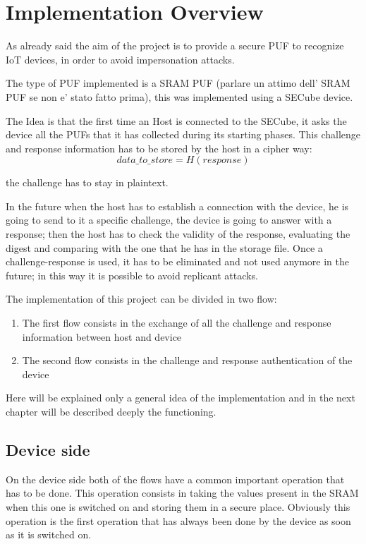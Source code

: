 \chapter{Implementation Overview}
As already said the aim of the project is to provide a secure PUF to recognize IoT devices, in order to avoid impersonation attacks.

The type of PUF implemented is a SRAM PUF (parlare un attimo dell' SRAM PUF se non e' stato fatto prima), this was implemented using a SECube device.

The Idea is that the first time an Host is connected to the SECube, it asks the device all the PUFs that it has collected during its starting phases.
This challenge and response information has to be stored by the host in a cipher way:
\begin{equation}\label{eq:eq1}
 data\_to\_store=H(response)
 \end{equation}
 
  the challenge has to stay in plaintext.

In the future when the host has to establish a connection with the device, he is going to send to it a specific challenge, the device is going to answer with a response;
then the host has to check the validity of the response, evaluating the digest and comparing with the one that he has in the storage file.
Once a challenge-response is used, it has to be eliminated and not used anymore in the future; in this way it is possible to avoid replicant attacks.


The implementation of this project can be divided in two flow:
\begin{enumerate}
	\item The first flow consists in the exchange of all the challenge and response information between host and device
	\item The second flow consists in the challenge and response authentication of the device
\end{enumerate}

Here will be explained only a general idea of the implementation and in the next chapter will be described deeply the functioning.

\section {Device side} 
On the device side both of the flows have a common important operation that has to be done. This operation consists in taking the values present in the SRAM when this one is switched on and storing them in a secure place. Obviously this operation is the first operation that has always been done by the device as soon as it is switched on.

